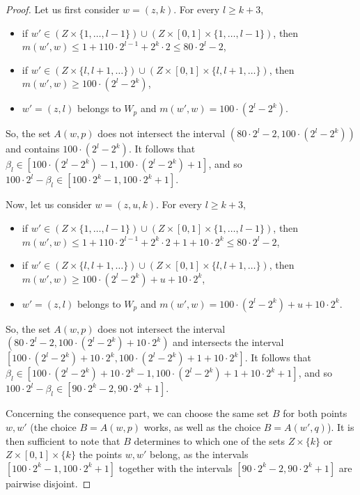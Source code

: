 \documentclass[a4paper]{amsart}
\theoremstyle{plain}
\theoremstyle{remark}
\begin{document}
\begin{proof}
Let us first consider $ w = (z, k) $. For every $ l \geq k + 3 $,
\begin{itemize}
\item if $ w' \in (Z \times \{ 1, \dots, l-1 \}) \cup (Z \times [0, 1] \times \{ 1, \dots, l-1 \}) $, then $ m(w', w) \leq 1 + 110 \cdot 2^{l-1} + 2^{k} \cdot 2 \leq 80 \cdot 2^{l} - 2 $,
\item if $ w' \in (Z \times \{ l, l+1, \dots \}) \cup (Z \times [0, 1] \times \{ l, l+1, \dots \}) $, then $ m(w', w) \geq 100 \cdot (2^{l} - 2^{k}) $,
\item $ w' = (z, l) $ belongs to $ W_{p} $ and $ m(w', w) = 100 \cdot (2^{l} - 2^{k}) $.
\end{itemize}
So, the set $ A(w, p) $ does not intersect the interval $ (80 \cdot 2^{l} - 2, 100 \cdot (2^{l} - 2^{k})) $ and contains $ 100 \cdot (2^{l} - 2^{k}) $. It follows that $ \beta_{l} \in [100 \cdot (2^{l} - 2^{k}) - 1, 100 \cdot (2^{l} - 2^{k}) + 1] $, and so $ 100 \cdot 2^{l} - \beta_{l} \in [100 \cdot 2^{k} - 1, 100 \cdot 2^{k} + 1] $.

Now, let us consider $ w = (z, u, k) $. For every $ l \geq k + 3 $,
\begin{itemize}
\item if $ w' \in (Z \times \{ 1, \dots, l-1 \}) \cup (Z \times [0, 1] \times \{ 1, \dots, l-1 \}) $, then $ m(w', w) \leq 1 + 110 \cdot 2^{l-1} + 2^{k} \cdot 2 + 1 + 10 \cdot 2^{k} \leq 80 \cdot 2^{l} - 2 $,
\item if $ w' \in (Z \times \{ l, l+1, \dots \}) \cup (Z \times [0, 1] \times \{ l, l+1, \dots \}) $, then $ m(w', w) \geq 100 \cdot (2^{l} - 2^{k}) + u + 10 \cdot 2^{k} $,
\item $ w' = (z, l) $ belongs to $ W_{p} $ and $ m(w', w) = 100 \cdot (2^{l} - 2^{k}) + u + 10 \cdot 2^{k} $.
\end{itemize}
So, the set $ A(w, p) $ does not intersect the interval $ (80 \cdot 2^{l} - 2, 100 \cdot (2^{l} - 2^{k}) + 10 \cdot 2^{k}) $ and intersects the interval $ [100 \cdot (2^{l} - 2^{k}) + 10 \cdot 2^{k}, 100 \cdot (2^{l} - 2^{k}) + 1 + 10 \cdot 2^{k}] $. It follows that $ \beta_{l} \in [100 \cdot (2^{l} - 2^{k}) + 10 \cdot 2^{k} - 1, 100 \cdot (2^{l} - 2^{k}) + 1 + 10 \cdot 2^{k} + 1] $, and so $ 100 \cdot 2^{l} - \beta_{l} \in [90 \cdot 2^{k} - 2, 90 \cdot 2^{k} + 1] $.

Concerning the consequence part, we can choose the same set $ B $ for both points $ w, w' $ (the choice $ B = A(w, p) $ works, as well as the choice $ B = A(w', q) $). It is then sufficient to note that $ B $ determines to which one of the sets $ Z \times \{ k \} $ or $ Z \times [0, 1] \times \{ k \} $ the points $ w, w' $ belong, as the intervals $ [100 \cdot 2^{k} - 1, 100 \cdot 2^{k} + 1] $ together with the intervals $ [90 \cdot 2^{k} - 2, 90 \cdot 2^{k} + 1] $ are pairwise disjoint.
\end{proof}
\end{document}
